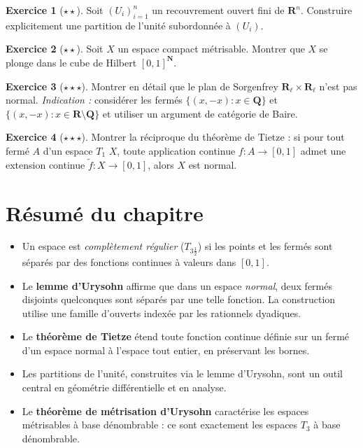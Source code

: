 \documentclass[12pt,a4paper,openany]{book}
\theoremstyle{definition}
\theoremstyle{cours}
\theoremstyle{coursnormal}
\newtheorem{exercice}{Exercice}[chapter]
\begin{document}
\begin{exercice}[$\star\star$]
\label{exo:partition-unite-Rn}
Soit $(U_i)_{i=1}^n$ un recouvrement ouvert fini de $\mathbf{R}^n$.
Construire explicitement une partition de l'unité subordonnée à
$(U_i)$.
\end{exercice}

\begin{exercice}[$\star\star$]
\label{exo:plongement-compact-metrisable}
Soit $X$ un espace compact métrisable. Montrer que $X$ se plonge dans
le cube de Hilbert $[0,1]^{\mathbf{N}}$.
\end{exercice}

\begin{exercice}[$\star\star\star$]
\label{exo:sorgenfrey-non-normal}
Montrer en détail que le plan de Sorgenfrey
$\mathbf{R}_\ell\times\mathbf{R}_\ell$ n'est pas normal.
\textit{Indication :} considérer les fermés
$\{(x,-x):x\in\mathbf{Q}\}$ et $\{(x,-x):x\in\mathbf{R}\setminus
\mathbf{Q}\}$ et utiliser un argument de catégorie de Baire.
\end{exercice}

\begin{exercice}[$\star\star\star$]
\label{exo:tietze-implique-normal}
Montrer la réciproque du théorème de Tietze : si pour tout fermé
$A$ d'un espace $T_1$ $X$, toute application continue
$f\colon A\to[0,1]$ admet une extension continue
$\tilde{f}\colon X\to[0,1]$, alors $X$ est normal.
\end{exercice}

\section*{Résumé du chapitre~\thechapter}

\begin{itemize}
  \item Un espace est \emph{complètement régulier} ($T_{3\frac{1}{2}}$)
    si les points et les fermés sont séparés par des fonctions continues
    à valeurs dans $[0,1]$.
  \item Le \textbf{lemme d'Urysohn} affirme que dans un espace
    \emph{normal}, deux fermés disjoints quelconques sont séparés par
    une telle fonction. La construction utilise une famille d'ouverts
    indexée par les rationnels dyadiques.
  \item Le \textbf{théorème de Tietze} étend toute fonction continue
    définie sur un fermé d'un espace normal à l'espace tout entier,
    en préservant les bornes.
  \item Les partitions de l'unité, construites via le lemme d'Urysohn,
    sont un outil central en géométrie différentielle et en analyse.
  \item Le \textbf{théorème de métrisation d'Urysohn} caractérise les
    espaces métrisables à base dénombrable : ce sont exactement les
    espaces $T_3$ à base dénombrable.
\end{itemize}
\end{document}
